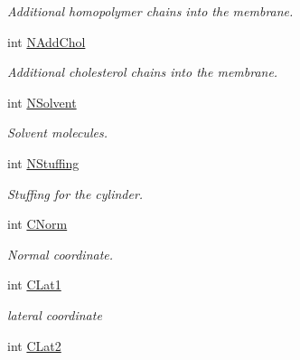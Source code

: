 \begin{DoxyCompactItemize}
\begin{DoxyCompactList}\small\item\em \-Additional homopolymer chains into the membrane. \end{DoxyCompactList}\item 
\hypertarget{classVarData_a115c0b70a52bddaf28fc27d2e78cfeba}{int \hyperlink{classVarData_a115c0b70a52bddaf28fc27d2e78cfeba}{\-N\-Add\-Chol}}\label{classVarData_a115c0b70a52bddaf28fc27d2e78cfeba}

\begin{DoxyCompactList}\small\item\em \-Additional cholesterol chains into the membrane. \end{DoxyCompactList}\item 
\hypertarget{classVarData_a2bc2df26f7a147d34aa971d2245eaf54}{int \hyperlink{classVarData_a2bc2df26f7a147d34aa971d2245eaf54}{\-N\-Solvent}}\label{classVarData_a2bc2df26f7a147d34aa971d2245eaf54}

\begin{DoxyCompactList}\small\item\em \-Solvent molecules. \end{DoxyCompactList}\item 
\hypertarget{classVarData_abf965a22571e95fe2a80899e567803bc}{int \hyperlink{classVarData_abf965a22571e95fe2a80899e567803bc}{\-N\-Stuffing}}\label{classVarData_abf965a22571e95fe2a80899e567803bc}

\begin{DoxyCompactList}\small\item\em \-Stuffing for the cylinder. \end{DoxyCompactList}\item 
\hypertarget{classVarData_ac5f3674d89bb344da0be11d57eea248e}{int \hyperlink{classVarData_ac5f3674d89bb344da0be11d57eea248e}{\-C\-Norm}}\label{classVarData_ac5f3674d89bb344da0be11d57eea248e}

\begin{DoxyCompactList}\small\item\em \-Normal coordinate. \end{DoxyCompactList}\item 
\hypertarget{classVarData_a08e2743fbc74ffadb73bf88a833cd03f}{int \hyperlink{classVarData_a08e2743fbc74ffadb73bf88a833cd03f}{\-C\-Lat1}}\label{classVarData_a08e2743fbc74ffadb73bf88a833cd03f}

\begin{DoxyCompactList}\small\item\em lateral coordinate \end{DoxyCompactList}\item 
\hypertarget{classVarData_a14ec5e9f32dac94d5974f23bbba4ff86}{int \hyperlink{classVarData_a14ec5e9f32dac94d5974f23bbba4ff86}{\-C\-Lat2}}\label{classVarData_a14ec5e9f32dac94d5974f23bbba4ff86}


\end{DoxyCompactItemize}
